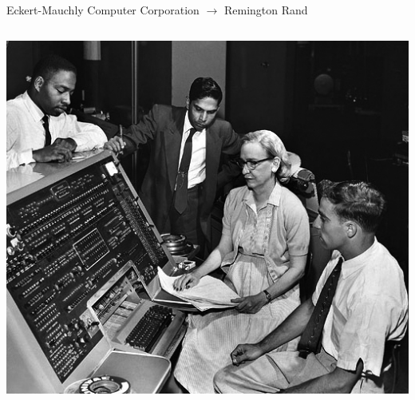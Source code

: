 \documentclass[aspectratio=169]{beamer}
\begin{document}
\begin{frame}[fragile]{Eckert-Mauchly Computer Corporation $\to$ Remington Rand}
\begin{columns}
\includegraphics[width=\linewidth]{Grace_Hopper_and_UNIVAC.jpg}
\end{columns}
\end{frame}




\begin{frame}{}
\end{frame}
\end{document}
